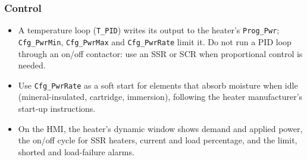 \subsubsection*{Control}
\begin{itemize}[itemsep=2pt]
  \item A temperature loop (\texttt{T\_PID}) writes its output to the heater's \texttt{Prog\_Pwr}; \texttt{Cfg\_PwrMin}, \texttt{Cfg\_PwrMax} and \texttt{Cfg\_PwrRate} limit it. Do not run a PID loop through an on/off contactor: use an SSR or SCR when proportional control is needed.
  \item Use \texttt{Cfg\_PwrRate} as a soft start for elements that absorb moisture when idle (mineral-insulated, cartridge, immersion), following the heater manufacturer's start-up instructions.
  \item On the HMI, the heater's dynamic window shows demand and applied power, the on/off cycle for SSR heaters, current and load percentage, and the limit, shorted and load-failure alarms.
\end{itemize}

